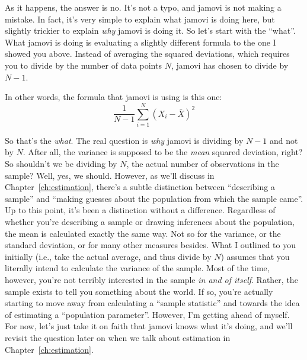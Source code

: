 As it happens, the answer is no. It's not a typo, and jamovi is not making a mistake. In fact, it's very simple to explain what jamovi is doing here, but slightly trickier to explain {\it why} jamovi is doing it. So let's start with the ``what''. What jamovi is doing is evaluating a slightly different formula to the one I showed you above. Instead of averaging the squared deviations, which requires you to divide by the number of data points $N$, jamovi has chosen to divide by $N-1$.

\vspace{0.5cm}
\begin{mdframed}[style=MyFrame,nobreak=true]
In other words, the formula that jamovi is using is this one:
$$
\frac{1}{N-1} \sum_{i=1}^N \left( X_i - \bar{X} \right)^2
$$
\end{mdframed}

So that's the {\it what}. The real question is {\it why} jamovi is dividing by $N-1$ and not by $N$. After all, the variance is supposed to be the {\it mean} squared deviation, right? So shouldn't we be dividing by $N$, the actual number of observations in the sample? Well, yes, we should. However, as we'll discuss in Chapter~\ref{ch:estimation}, there's a subtle distinction between ``describing a sample'' and ``making guesses about the population from which the sample came''. Up to this point, it's been a distinction without a difference. Regardless of whether you're describing a sample or drawing inferences about the population, the mean is calculated exactly the same way. Not so for the variance, or the standard deviation, or for many other measures besides. What I outlined to you initially (i.e., take the actual average, and thus divide by $N$) assumes that you literally intend to calculate the variance of the sample. Most of the time, however, you're not terribly interested in the sample {\it in and of itself}. Rather, the sample exists to tell you something about the world. If so, you're actually starting to move away from calculating a ``sample statistic'' and towards the idea of estimating a ``population parameter''. However, I'm getting ahead of myself. For now, let's just take it on faith that jamovi knows what it's doing, and we'll revisit the question later on when we talk about estimation in Chapter~\ref{ch:estimation}. 

